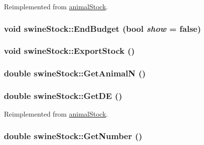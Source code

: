 Reimplemented from \hyperlink{classanimal_stock_ab95f31939d8d1cbc1bb2f567375995ae}{animalStock}.\hypertarget{classswine_stock_a473b8e850355273ad6cf37b36ae31e14}{
\subsubsection[{EndBudget}]{\setlength{\rightskip}{0pt plus 5cm}void swineStock::EndBudget (bool {\em show} = {\ttfamily false})}}
\label{classswine_stock_a473b8e850355273ad6cf37b36ae31e14}
\hypertarget{classswine_stock_afeb3c33e9c241c408aabf971a1666196}{
\subsubsection[{ExportStock}]{\setlength{\rightskip}{0pt plus 5cm}void swineStock::ExportStock ()}}
\label{classswine_stock_afeb3c33e9c241c408aabf971a1666196}
\hypertarget{classswine_stock_af9621b75adfaf8ab25752627dd344479}{
\subsubsection[{GetAnimalN}]{\setlength{\rightskip}{0pt plus 5cm}double swineStock::GetAnimalN ()}}
\label{classswine_stock_af9621b75adfaf8ab25752627dd344479}
\hypertarget{classswine_stock_ac7b5455c4b474d3be67c17ce9d7f61ea}{
\subsubsection[{GetDE}]{\setlength{\rightskip}{0pt plus 5cm}double swineStock::GetDE ()}}
\label{classswine_stock_ac7b5455c4b474d3be67c17ce9d7f61ea}


Reimplemented from \hyperlink{classanimal_stock_a8bed676752d1e6414c9a73fe72e3cb85}{animalStock}.\hypertarget{classswine_stock_a810cd4f4ffc068a42edf008b1288606d}{
\subsubsection[{GetNumber}]{\setlength{\rightskip}{0pt plus 5cm}double swineStock::GetNumber ()}}
\label{classswine_stock_a810cd4f4ffc068a42edf008b1288606d}


